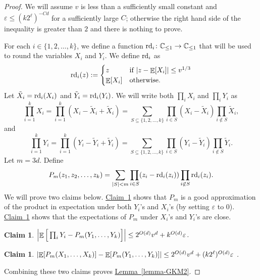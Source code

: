 \documentclass[11pt]{article}
\numberwithin{equation}{section}
\newtheorem{claim}[theorem]{Claim}
\theoremstyle{definition}
\theoremstyle{plain}
\newcommand{\C}{\mathbb C}
\newcommand{\expref}[2]{\hyperref[#2]{#1~\ref{#2}}}
\def\eps{\varepsilon}
\def\Blocklength{\ell}
\def\rd{\textnormal{rd}}
\DeclarePairedDelimiter{\abs}{\lvert}{\rvert}
\DeclareMathOperator*{\E}{\mathbb{E}}                 %
\begin{document}
  \begin{proof}
    We will assume $v$ is less than a sufficiently small constant and $\eps \le (k 2^\Blocklength)^{-Cd}$ for a sufficiently large $C$; otherwise the right hand side of the inequality is greater than $2$ and there is nothing to prove.

    \medskip

    For each $i \in \{1, 2, \ldots, k\}$, we define a function $\rd_i \colon \C_{\le 1} \to \C_{\le 1}$ that will be used to round the variables $X_i$ and $Y_i$.
    We define $\rd_i$ as
    \[ \rd_i(z) :=
      \begin{cases}
        z & \text{if $\abs{z - \E[X_i]} \le v^{1/3}$} \\
        \E[X_i] & \text{otherwise.}
      \end{cases}
    \]
    Let $\tilde X_i = \rd_i(X_i)$ and $\tilde Y_i = \rd_i(Y_i)$.
    We will write both $\prod_i X_i$ and $\prod_i Y_i$ as
    \[
      \prod_{i = 1}^k X_i
      = \prod_{i = 1}^k (X_i - \tilde X_i + \tilde X_i)
      = \sum_{ S \subseteq \{1, 2, \ldots, k\} } \prod_{i \in S} (X_i - \tilde X_i) \prod_{i \not\in S} \tilde X_i ,
    \]
    and
    \[
      \prod_{i = 1}^k Y_i
      = \prod_{i = 1}^k (Y_i - \tilde Y_i + \tilde Y_i)
      = \sum_{ S \subseteq \{1, 2, \ldots, k\} } \prod_{i \in S} (Y_i - \tilde Y_i) \prod_{i \not\in S} \tilde Y_i .
    \]
    Let $m = 3d$.
    Define
    \[
      P_m(z_1, z_2, \ldots, z_k)
      = \sum_{\abs{S} < m} \prod_{i \in S} (z_i - \rd_i(z_i)) \prod_{i \not\in S} \rd_i(z_i).
    \]
    We will prove two claims below.
    \expref{Claim}{claim:Pm-good-approx} shows that $P_m$ is a good approximation of the product in expectation under both $Y_i$'s and $X_i$'s (by setting $\eps$ to $0$).
    \expref{Claim}{claim:closeness-Pm} shows that the expectations of $P_m$ under $X_i$'s and $Y_i$'s are close.

    \begin{claim} \label{claim:Pm-good-approx}
      $\abs*{ \E \Big[ \prod_i Y_i - P_m(Y_1, \ldots, Y_k) \Big] }
      \le 2^{O(d)} v^d + k^{O(d)} \eps$.
    \end{claim}

    \begin{claim} \label{claim:closeness-Pm}
      $\abs{ \E[P_m(X_1, \ldots, X_k)] - \E[P_m(Y_1, \ldots, Y_k)] } \le 2^{O(d)} v^d + (k 2^\ell)^{O(d)} \eps$ .
    \end{claim}

    Combining these two claims proves \expref{Lemma}{lemma-GKM2}.
  \end{proof}
\end{document}
